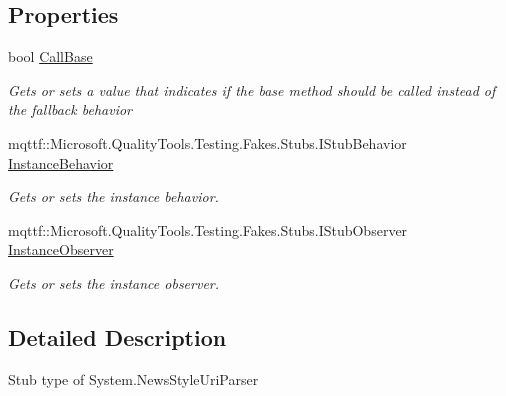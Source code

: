 \subsection*{Properties}
\begin{DoxyCompactItemize}
\item 
bool \hyperlink{class_system_1_1_fakes_1_1_stub_news_style_uri_parser_a00571bf16fe302fe20f49fb310a36cbe}{Call\-Base}
\begin{DoxyCompactList}\small\item\em Gets or sets a value that indicates if the base method should be called instead of the fallback behavior\end{DoxyCompactList}\item 
mqttf\-::\-Microsoft.\-Quality\-Tools.\-Testing.\-Fakes.\-Stubs.\-I\-Stub\-Behavior \hyperlink{class_system_1_1_fakes_1_1_stub_news_style_uri_parser_a37b6633f69f3e6be235304afb82a896e}{Instance\-Behavior}
\begin{DoxyCompactList}\small\item\em Gets or sets the instance behavior.\end{DoxyCompactList}\item 
mqttf\-::\-Microsoft.\-Quality\-Tools.\-Testing.\-Fakes.\-Stubs.\-I\-Stub\-Observer \hyperlink{class_system_1_1_fakes_1_1_stub_news_style_uri_parser_adc1b419b65d439718c2b939d5ff5f00c}{Instance\-Observer}
\begin{DoxyCompactList}\small\item\em Gets or sets the instance observer.\end{DoxyCompactList}\end{DoxyCompactItemize}


\subsection{Detailed Description}
Stub type of System.\-News\-Style\-Uri\-Parser



